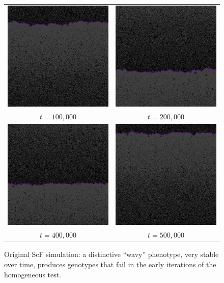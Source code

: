 \begin{figure}
	\begin{tabular}{cc}
		\includegraphics[width=.23\textwidth]{img/sm100000}&
		\includegraphics[width=.23\textwidth]{img/sm200000}\\
		$t=100,000$&
		$t=200,000$\\
		\includegraphics[width=.23\textwidth]{img/sm400000}&
		\includegraphics[width=.23\textwidth]{img/sm500000}\\
		$t=400,000$&
		$t=500,000$
	\end{tabular}
\caption{Original ScF simulation: a distinctive ``wavy'' phenotype, very stable over time, produces genotypes that fail in the early iterations of the homogeneous test.}
\label{fig:smalldistinctive}
\end{figure}

